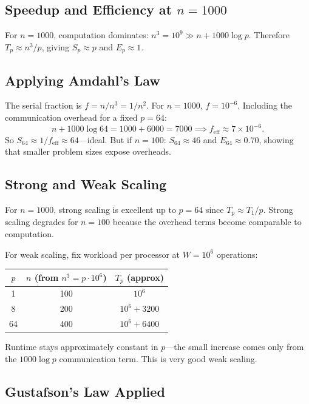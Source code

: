 \subsection{Speedup and Efficiency at $n = 1000$}

For $n = 1000$, computation dominates: $n^3 = 10^9 \gg n + 1000 \log p$.
Therefore $T_p \approx n^3/p$, giving $S_p \approx p$ and $E_p \approx 1$.

\subsection{Applying Amdahl's Law}

The serial fraction is $f = n / n^3 = 1/n^2$. For $n = 1000$, $f = 10^{-6}$.
Including the communication overhead for a fixed $p = 64$:
\[
  n + 1000 \log 64 = 1000 + 6000 = 7000 \implies f_{\text{eff}} \approx 7 \times 10^{-6}.
\]
So $S_{64} \approx 1/f_{\text{eff}} \approx 64$---ideal. But if $n = 100$:
$S_{64} \approx 46$ and $E_{64} \approx 0.70$, showing that smaller problem
sizes expose overheads.

\subsection{Strong and Weak Scaling}

For $n = 1000$, strong scaling is excellent up to $p = 64$ since $T_p \approx T_1/p$.
Strong scaling degrades for $n = 100$ because the overhead terms become comparable
to computation.

For weak scaling, fix workload per processor at $W = 10^6$ operations:

\begin{center}
\begin{tabular}{ccc}
\toprule
$p$ & $n$ (from $n^3 = p \cdot 10^6$) & $T_p$ (approx) \\
\midrule
1  & 100 & $10^6$ \\
8  & 200 & $10^6 + 3200$ \\
64 & 400 & $10^6 + 6400$ \\
\bottomrule
\end{tabular}
\end{center}

Runtime stays approximately constant in $p$---the small increase comes only from
the $1000 \log p$ communication term. This is very good weak scaling.

\subsection{Gustafson's Law Applied}

